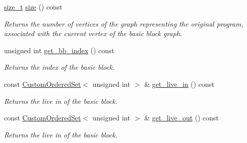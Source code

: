 \begin{DoxyCompactItemize}
\hyperlink{tutorial__fpt__2017_2intro_2sixth_2test_8c_a7c94ea6f8948649f8d181ae55911eeaf}{size\+\_\+t} \hyperlink{structBBNodeInfo_a49f0b957871c3d7660d048e0bb63e171}{size} () const
\begin{DoxyCompactList}\small\item\em Returns the number of vertices of the graph representing the original program, associated with the current vertex of the basic block graph. \end{DoxyCompactList}\item 
unsigned int \hyperlink{structBBNodeInfo_a0b125a0b615083e9fe380beb78b0bd0e}{get\+\_\+bb\+\_\+index} () const
\begin{DoxyCompactList}\small\item\em Returns the index of the basic block. \end{DoxyCompactList}\item 
const \hyperlink{classCustomOrderedSet}{Custom\+Ordered\+Set}$<$ unsigned int $>$ \& \hyperlink{structBBNodeInfo_ac807a421ffa8d922408050cc1e41a535}{get\+\_\+live\+\_\+in} () const
\begin{DoxyCompactList}\small\item\em Returns the live in of the basic block. \end{DoxyCompactList}\item 
const \hyperlink{classCustomOrderedSet}{Custom\+Ordered\+Set}$<$ unsigned int $>$ \& \hyperlink{structBBNodeInfo_ab38bfe567b8a4c7a4d6c278a45cb22d4}{get\+\_\+live\+\_\+out} () const
\begin{DoxyCompactList}\small\item\em Returns the live in of the basic block. \end{DoxyCompactList}\end{DoxyCompactItemize}
